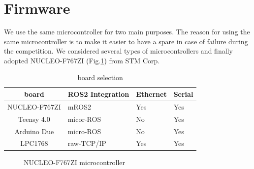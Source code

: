 \documentclass[lettersize,journal]{IEEEtran}
\begin{document}
\section{Firmware}
We use the same microcontroller for two main purposes.
The reason for using the same microcontroller is to make it easier to have a spare in case of failure during the competition.
We considered several types of microcontrollers and finally adopted NUCLEO-F767ZI (Fig.\ref{fig:f767zi}) from STM Corp.

\begin{table}[htbp]
    \caption{board selection}
    \label{table:board_selection}
    \centering
     \begin{tabular}{clll}
      \hline
      board & ROS2 Integration & Ethernet & Serial \\
      \hline \hline
      NUCLEO-F767ZI & mROS2 & Yes & Yes \\
      Teensy 4.0 & micor-ROS & No & Yes \\
      Arduino Due & micro-ROS & No & Yes \\
      LPC1768 & raw-TCP/IP & Yes & Yes \\
      \hline
     \end{tabular}
\end{table}

\begin{figure}[htbp]
    \begin{center}
  \end{center}
  \caption{NUCLEO-F767ZI microcontroller}
  \label{fig:f767zi}
\end{figure}
\end{document}
